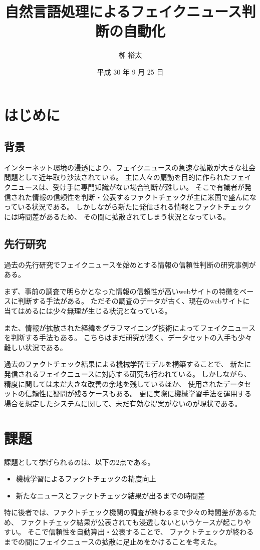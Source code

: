 \documentclass[twocolumn, a4paper, uplatex]{UECIEresume}
\title{自然言語処理によるフェイクニュース判断の自動化}
\date{平成 30 年 9 月 25 日}
\affiliation{総合情報学科 メディア情報学 コース}
\author{栁 裕太}
\begin{document}
\maketitle

\section{はじめに}
\subsection{背景}
インターネット環境の浸透により、フェイクニュースの急速な拡散が大きな社会問題として近年取り沙汰されている。
主に人々の扇動を目的に作られたフェイクニュースは、受け手に専門知識がない場合判断が難しい。
そこで有識者が発信された情報の信頼性を判断・公表するファクトチェックが主に米国で盛んになっている状況である。
しかしながら新たに発信される情報とファクトチェックには時間差があるため、
その間に拡散されてしまう状況となっている。

\subsection{先行研究}
過去の先行研究でフェイクニュースを始めとする情報の信頼性判断の研究事例がある。

まず、事前の調査で明らかとなった情報の信頼性が高いwebサイトの特徴をベースに判断する手法\cite{fuk}がある。
ただその調査のデータが古く、現在のwebサイトに当てはめるには少々無理が生じる状況となっている。

また、情報が拡散された経緯をグラフマイニング技術によってフェイクニュースを判断する手法\cite{foot}もある。
こちらはまだ研究が浅く、データセットの入手も少々難しい状況である。

過去のファクトチェック結果による機械学習モデルを構築することで、
新たに発信されるフェイクニュースに対応する研究も行われている\cite{nb}\cite{gilda}。
しかしながら、精度に関しては未だ大きな改善の余地を残しているほか、
使用されたデータセットの信頼性に疑問が残るケースもある。
更に実際に機械学習手法を運用する場合を想定したシステムに関して、未だ有効な提案がないのが現状である。

\section{課題}
課題として挙げられるのは、以下の2点である。
\begin{itemize}
  \item 機械学習によるファクトチェックの精度向上
  \item 新たなニュースとファクトチェック結果が出るまでの時間差
\end{itemize}
特に後者では、ファクトチェック機関の調査が終わるまで少々の時間差があるため、
ファクトチェック結果が公表されても浸透しないというケースが起こりやすい。
そこで信頼性を自動算出・公表することで、
ファクトチェックが終わるまでの間にフェイクニュースの拡散に足止めをかけることを考えた。
\end{document}
